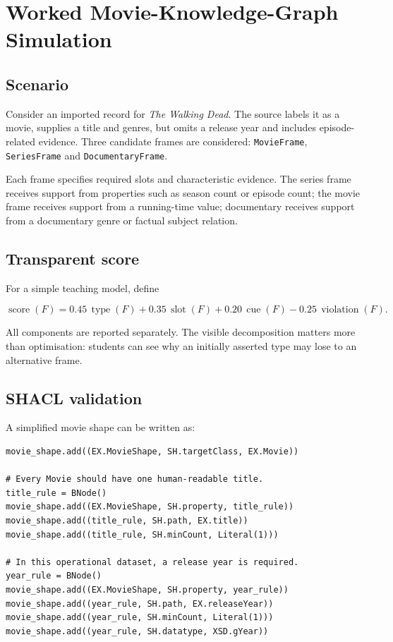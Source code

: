 \documentclass[11pt,a4paper]{article}
\begin{document}
\section{Worked Movie-Knowledge-Graph Simulation}

\subsection{Scenario}

Consider an imported record for \emph{The Walking Dead}. The source labels it as
a movie, supplies a title and genres, but omits a release year and includes
episode-related evidence. Three candidate frames are considered:
\texttt{MovieFrame}, \texttt{SeriesFrame} and \texttt{DocumentaryFrame}.

Each frame specifies required slots and characteristic evidence. The series
frame receives support from properties such as season count or episode count;
the movie frame receives support from a running-time value; documentary receives
support from a documentary genre or factual subject relation.

\subsection{Transparent score}

For a simple teaching model, define

\begin{equation}
\operatorname{score}(F)=
0.45\,\operatorname{type}(F)+
0.35\,\operatorname{slot}(F)+
0.20\,\operatorname{cue}(F)-
0.25\,\operatorname{violation}(F).
\end{equation}

All components are reported separately. The visible decomposition matters more
than optimisation: students can see why an initially asserted type may lose to
an alternative frame.

\subsection{SHACL validation}

A simplified movie shape can be written as:

\begin{lstlisting}[style=pythonstyle,caption={Python construction of two SHACL requirements.}]
movie_shape.add((EX.MovieShape, SH.targetClass, EX.Movie))

# Every Movie should have one human-readable title.
title_rule = BNode()
movie_shape.add((EX.MovieShape, SH.property, title_rule))
movie_shape.add((title_rule, SH.path, EX.title))
movie_shape.add((title_rule, SH.minCount, Literal(1)))

# In this operational dataset, a release year is required.
year_rule = BNode()
movie_shape.add((EX.MovieShape, SH.property, year_rule))
movie_shape.add((year_rule, SH.path, EX.releaseYear))
movie_shape.add((year_rule, SH.minCount, Literal(1)))
movie_shape.add((year_rule, SH.datatype, XSD.gYear))
\end{lstlisting}
\end{document}
